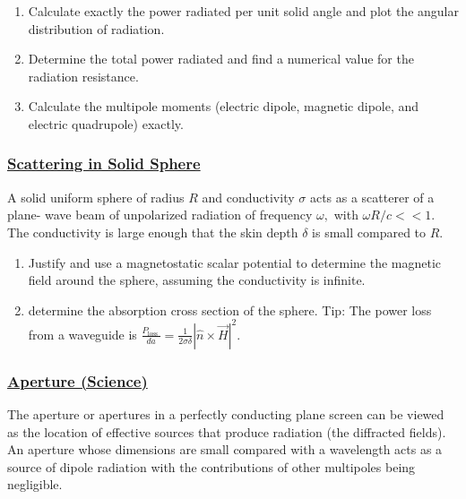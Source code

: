 \begin{enumerate}
	\item Calculate exactly the power radiated per unit solid angle and plot the angular distribution of radiation.
	\item  Determine the total power radiated and find a numerical value for the radiation resistance.
	\item Calculate the multipole moments (electric dipole, magnetic dipole, and electric quadrupole) exactly.	
\end{enumerate}

\subsubsection{\hyperref[Scattering in Solid Sphere]{Scattering in Solid Sphere}}

A solid uniform sphere of radius $R$ and conductivity $\sigma$ acts as a scatterer of a plane- wave beam of unpolarized radiation of frequency $\omega,$ with $\omega R / c<<1$. The conductivity is large enough that the skin depth $\delta$ is small compared to $R$.

\begin{enumerate}
	\item Justify and use a magnetostatic scalar potential to determine the magnetic field around the sphere, assuming the conductivity is infinite.
	\item determine the absorption cross section of the sphere. Tip: The power loss from a waveguide is $\frac{P_{\text {loss }}}{d a}=\frac{1}{2 \sigma \delta}|\hat{n} \times \vec{H}|^{2}$.
\end{enumerate}

\subsubsection{\hyperref[Aperture (Science)]{Aperture (Science)}}

The aperture or apertures in a perfectly conducting plane screen can be viewed as the location of effective sources that produce radiation (the diffracted fields). An aperture whose dimensions are small compared with a wavelength acts as a source of dipole radiation with the contributions of other multipoles being negligible.

